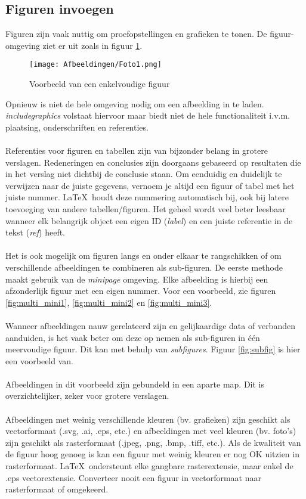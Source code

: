 \subsection{Figuren invoegen}
Figuren zijn vaak nuttig om proefopstellingen en grafieken te tonen. De figuur-omgeving ziet er uit zoals in figuur \ref{fig:single}.

\begin{figure}[h]
    \centering
    \texttt{[image: Afbeeldingen/Foto1.png]}
    \caption{Voorbeeld van een enkelvoudige figuur}
    \label{fig:single}
\end{figure}

\noindent Opnieuw is niet de hele omgeving nodig om een afbeelding in te laden. \textit{includegraphics} volstaat hiervoor maar biedt niet de hele functionaliteit i.v.m. plaatsing, onderschriften en referenties.
\\ \\
Referenties voor figuren en tabellen zijn van bijzonder belang in grotere verslagen. Redeneringen en conclusies zijn doorgaans gebaseerd op resultaten die in het verslag niet dichtbij de conclusie staan. Om eenduidig en duidelijk te verwijzen naar de juiste gegevens, vernoem je altijd een figuur of tabel met het juiste nummer. \LaTeX\ houdt deze nummering automatisch bij, ook bij latere toevoeging van andere tabellen/figuren. Het geheel wordt veel beter leesbaar wanneer elk belangrijk object een eigen ID (\textit{label}) en een juiste referentie in de tekst (\textit{ref}) heeft.
\\ \\
Het is ook mogelijk om figuren langs en onder elkaar te rangschikken of om verschillende afbeeldingen te combineren als sub-figuren. De eerste methode maakt gebruik van de \textit{minipage} omgeving. Elke afbeelding is hierbij een afzonderlijk figuur met een eigen nummer. Voor een voorbeeld, zie figuren \ref{fig:multi_mini1}, \ref{fig:multi_mini2} en \ref{fig:multi_mini3}.
\\ \\
Wanneer afbeeldingen nauw gerelateerd zijn en gelijkaardige data of verbanden aanduiden, is het vaak beter om deze op nemen als sub-figuren in één meervoudige figuur. Dit kan met behulp van \textit{subfigures}. Figuur \ref{fig:subfig} is hier een voorbeeld van.
\\ \\
Afbeeldingen in dit voorbeeld zijn gebundeld in een aparte map. Dit is overzichtelijker, zeker voor grotere verslagen.
\\ \\
Afbeeldingen met weinig verschillende kleuren (bv. grafieken) zijn geschikt als vectorformaat (.svg, .ai, .eps, etc.) en afbeeldingen met veel kleuren (bv. foto's) zijn geschikt als rasterformaat (.jpeg, .png, .bmp, .tiff, etc.). Als de kwaliteit van de figuur hoog genoeg is kan een figuur met weinig kleuren er nog OK uitzien in rasterformaat. \LaTeX\ ondersteunt elke gangbare rasterextensie, maar enkel de .eps vectorextensie. Converteer nooit een figuur in vectorformaat naar rasterformaat of omgekeerd. 

